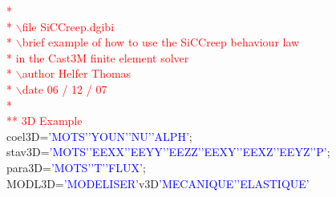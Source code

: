 \noindent
\textcolor{red}{*}\\
\textcolor{red}{* $\backslash{}$file   SiCCreep.dgibi}\\
\textcolor{red}{* $\backslash{}$brief  example of how to use the SiCCreep behaviour law}\\
\textcolor{red}{* in the Cast3M finite element solver}\\
\textcolor{red}{* $\backslash{}$author Helfer Thomas}\\
\textcolor{red}{* $\backslash{}$date   06 / 12 / 07}\\
\textcolor{red}{*}\\
\newline
\textcolor{red}{** 3D Example}\\
\newline
coel3D\hspace*{1em}=\hspace*{1em}\textcolor{blue}{'MOTS'}\hspace*{1em}\textcolor{blue}{'YOUN'}\hspace*{1em}\textcolor{blue}{'NU'}\hspace*{1em}\textcolor{blue}{'ALPH'};\\
stav3D\hspace*{1em}=\hspace*{1em}\textcolor{blue}{'MOTS'}\hspace*{1em}\textcolor{blue}{'EEXX'}\hspace*{1em}\textcolor{blue}{'EEYY'}\hspace*{1em}\textcolor{blue}{'EEZZ'}\hspace*{1em}\textcolor{blue}{'EEXY'}\hspace*{1em}\textcolor{blue}{'EEXZ'}\hspace*{1em}\textcolor{blue}{'EEYZ'}\hspace*{1em}\hspace*{1em}\textcolor{blue}{'P'};\\
para3D\hspace*{1em}=\hspace*{1em}\textcolor{blue}{'MOTS'}\hspace*{1em}\textcolor{blue}{'T'}\hspace*{1em}\textcolor{blue}{'FLUX'};\\
\newline
MODL3D\hspace*{1em}=\hspace*{1em}\textcolor{blue}{'MODELISER'}\hspace*{1em}v3D\hspace*{1em}\textcolor{blue}{'MECANIQUE'}\hspace*{1em}\textcolor{blue}{'ELASTIQUE'}\\
